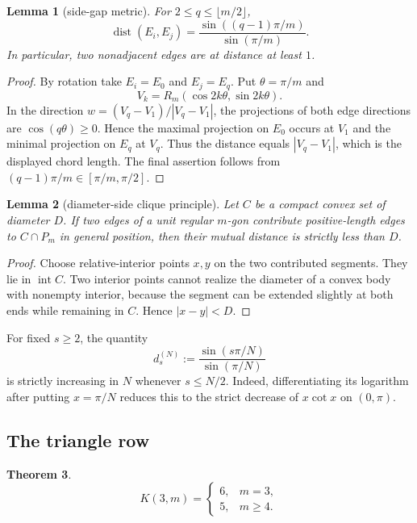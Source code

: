 \documentclass[11pt]{article}
\newtheorem{theorem}{Theorem}[section]
\newtheorem{lemma}[theorem]{Lemma}
\theoremstyle{remark}
\newcommand{\dist}{\operatorname{dist}}
\begin{document}
\begin{lemma}[side-gap metric]\label{lem:sidegap}
For $2\le q\le\lfloor m/2\rfloor$,
\[
\dist(E_i,E_j)=\frac{\sin((q-1)\pi/m)}{\sin(\pi/m)}.
\]
In particular, two nonadjacent edges are at distance at least $1$.
\end{lemma}

\begin{proof}
By rotation take $E_i=E_0$ and $E_j=E_q$. Put $\theta=\pi/m$ and
\[
V_k=R_m(\cos2k\theta,\sin2k\theta).
\]
In the direction $w=(V_q-V_1)/|V_q-V_1|$, the projections of both edge directions are $\cos(q\theta)\ge0$. Hence the maximal projection on $E_0$ occurs at $V_1$ and the minimal projection on $E_q$ at $V_q$. Thus the distance equals $|V_q-V_1|$, which is the displayed chord length. The final assertion follows from $(q-1)\pi/m\in[\pi/m,\pi/2]$.
\end{proof}

\begin{lemma}[diameter-side clique principle]\label{lem:clique}
Let $C$ be a compact convex set of diameter $D$. If two edges of a unit regular $m$-gon contribute positive-length edges to $C\cap P_m$ in general position, then their mutual distance is strictly less than $D$.
\end{lemma}

\begin{proof}
Choose relative-interior points $x,y$ on the two contributed segments. They lie in $\operatorname{int}C$. Two interior points cannot realize the diameter of a convex body with nonempty interior, because the segment can be extended slightly at both ends while remaining in $C$. Hence $|x-y|<D$.
\end{proof}

For fixed $s\ge2$, the quantity
\[
d_s^{(N)}:=\frac{\sin(s\pi/N)}{\sin(\pi/N)}
\]
is strictly increasing in $N$ whenever $s\le N/2$. Indeed, differentiating its logarithm after putting $x=\pi/N$ reduces this to the strict decrease of $x\cot x$ on $(0,\pi)$.

\subsection{The triangle row}

\begin{theorem}\label{thm:triangle-row}
\[
K(3,m)=
\begin{cases}
6,&m=3,\\
5,&m\ge4.
\end{cases}
\]
\end{theorem}
\end{document}
